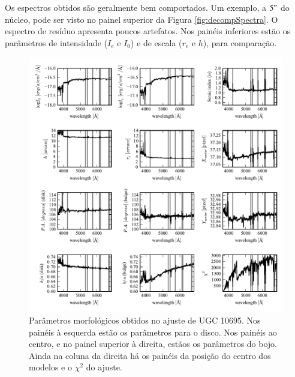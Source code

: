 Os espectros obtidos são geralmente bem comportados. Um exemplo, a $5"$ do
núcleo, pode ser visto no painel superior da Figura \ref{fig:decompSpectra}.
O espectro de resíduo apresenta poucos artefatos. Nos painéis inferiores estão
os parâmetros de intensidade ($I_e$ e $I_0$) e de escala ($r_e$ e $h$), para
comparação.

\begin{figure}
	\includegraphics{figuras/decomp-fit-parameters}
	\caption[Parâmetros morfológicos] {Parâmetros morfológicos obtidos no ajuste
	de UGC 10695. Nos painéis à esquerda estão os parâmetros para o disco. Nos
	painéis ao centro, e no painel superior à direita, estãos os parâmetros do
	bojo. Ainda na coluna da direita há os painéis da posição do centro dos
	modelos e o $\chi^2$ do ajuste.}
	\label{fig:decompParams}
\end{figure}

